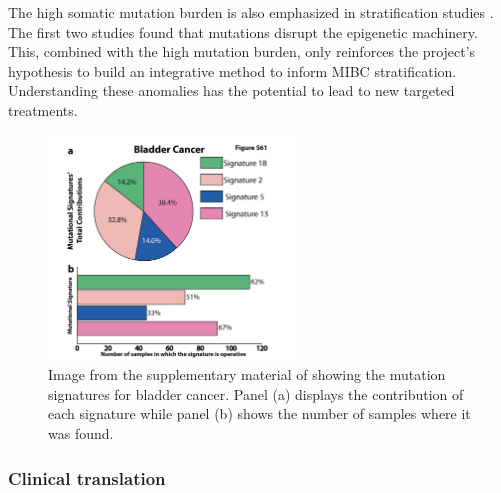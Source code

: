 The high somatic mutation burden is also emphasized in stratification studies \cite{Tcga2014-dr, Robertson2017-mg, Kamoun2020-tj}. The first two studies found that mutations disrupt the epigenetic machinery. This, combined with the high mutation burden, only reinforces the project's hypothesis to build an integrative method to inform MIBC stratification. Understanding these anomalies has the potential to lead to new targeted treatments.

\begin{figure}[!htb]    
    \centering
\includegraphics[width=0.6\textwidth,height=0.6\textheight,keepaspectratio]{Sections/Lit_review/Resources/bladder_mut_sig.png}
    \caption{Image from the supplementary material of \cite{Alexandrov2013-gi} showing the mutation signatures for bladder cancer. Panel (a) displays the contribution of each signature while panel (b) shows the number of samples where it was found.}
    \label{fig:lit:bladder_mut_sig}
\end{figure}


\subsubsection{Clinical translation}


